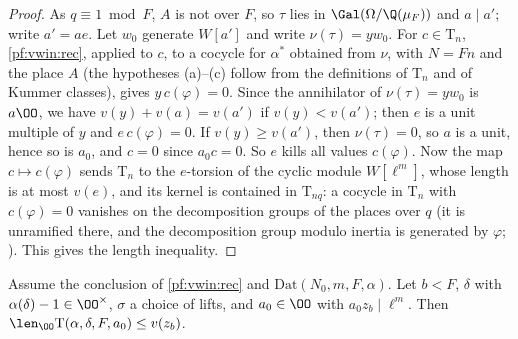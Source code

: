 \begin{proof}
As $q\equiv1\bmod F$, $A$ is not over $F$, so $\tau$ lies in $\Gal(\Omega/\Q(\mu_F))$ and $a\mid a'$; write $a'=ae$. Let $w_0$ generate
$W[a']$ and write $\nu(\tau)=yw_0$. For $c\in\mathrm{T}_n$, \cref{pf:vwin:rec}, applied to $c$, to a cocycle for $\alpha^*$ obtained from $\nu$,
with $N=Fn$ and the place $A$ (the hypotheses (a)--(c) follow from the definitions of $\mathrm{T}_n$ and of Kummer classes), gives
$y\,c(\varphi)=0$. Since the annihilator of $\nu(\tau)=yw_0$ is $a\OO$, we have $v(y)+v(a)=v(a')$ if
$v(y)<v(a')$; then $e$ is a unit multiple of $y$ and $e\,c(\varphi)=0$. If $v(y)\ge v(a')$, then $\nu(\tau)=0$, so $a$ is a unit, hence so is
$a_0$, and $c=0$ since $a_0c=0$. So $e$ kills all values $c(\varphi)$. Now the map $c\mapsto c(\varphi)$ sends $\mathrm{T}_n$ to the
$e$-torsion of the cyclic module $W[\ell^m]$, whose length is at most $v(e)$, and its kernel is contained in $\mathrm{T}_{nq}$: a cocycle in
$\mathrm{T}_n$ with $c(\varphi)=0$ vanishes on the decomposition groups of the places over $q$ (it is unramified there, and the decomposition
group modulo inertia is generated by $\varphi$; ). This gives the length inequality.
\end{proof}

\begin{proposition}\label{pf:vwin:count}
Assume the conclusion of \cref{pf:vwin:rec} and $\mathrm{Dat}(N_0,m,F,\alpha)$. Let $b<F$, $\delta$ with $\alpha(\delta)-1\in\OO^\times$, $\sigma$ a
choice of lifts, and $a_0\in\OO$ with $a_0z_b\mid\ell^m$. Then $\len_\OO\mathrm{T}(\alpha,\delta,F,a_0)\le v(z_b)$.
\end{proposition}

